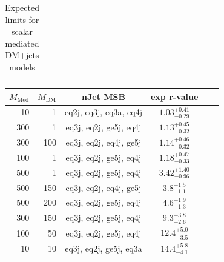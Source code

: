 \begin{table}
\begin{tabular}{rrcccc}
    \hline\hline
  \end{tabular}
  \caption{Expected limits for scalar mediated DM+jets models}
  \label{tab:DMS_exp}
\end{table}


\begin{table}
  \centering
  \begin{tabular}{rrcccc}
    \hline\hline
    $M_{\text{Med}}$ & $M_{\text{DM}}$ & nJet MSB & exp r-value\\
    \hline
       10 &   1 & eq2j, eq3j, eq3a, eq4j & $1.03_{-0.29}^{+0.41}$ \\ %
      300 &   1 & eq3j, eq2j, ge5j, eq4j & $1.13_{-0.32}^{+0.45}$ \\ %
      300 & 100 & eq3j, eq2j, eq4j, ge5j & $1.14_{-0.32}^{+0.46}$ \\ %
      100 &   1 & eq3j, eq2j, ge5j, eq4j & $1.18_{-0.33}^{+0.47}$ \\ %
      500 &   1 & eq3j, eq2j, ge5j, eq4j & $3.42_{-0.96}^{+1.40}$ \\ %
      500 & 150 & eq3j, eq2j, eq4j, ge5j & $3.8_{-1.1}^{+1.5}$    \\ %
      500 & 200 & eq3j, eq2j, ge5j, eq4j & $4.6_{-1.3}^{+1.9}$    \\ %
      300 & 150 & eq3j, eq2j, ge5j, eq4j & $9.3_{-2.6}^{+3.8}$    \\ %
      100 &  50 & eq3j, eq2j, ge5j, eq4j & $12.4_{-3.5}^{+5.0}$   \\ %
       10 &  10 & eq3j, eq2j, ge5j, eq3a & $14.4_{-4.1}^{+5.8}$   \\ %

\end{tabular}
\end{table}
